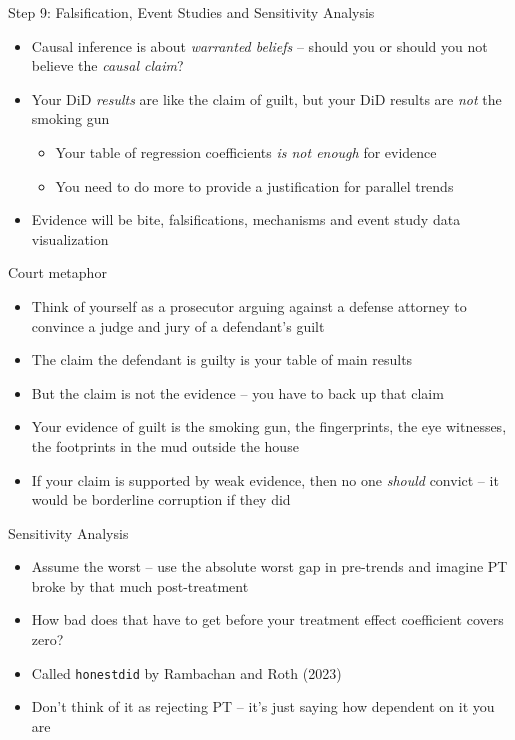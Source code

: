 \documentclass{beamer}
\begin{document}
\begin{frame}{Step 9: Falsification, Event Studies and Sensitivity Analysis}

\begin{itemize}
\item Causal inference is about \emph{warranted beliefs} -- should you or should you not believe the \emph{causal claim}?
\item Your DiD \emph{results} are like the claim of guilt, but your DiD results are \emph{not} the smoking gun
	\begin{itemize}
	\item Your table of regression coefficients \emph{is not enough} for evidence
	\item You need to do more to provide a justification for parallel trends
	\end{itemize}
\item Evidence will be bite, falsifications, mechanisms and event study data visualization 
\end{itemize}

\end{frame}


\begin{frame}{Court metaphor}

	\begin{itemize}
	\item Think of yourself as a prosecutor arguing against a defense attorney to convince a judge and jury of a defendant's guilt
	\item The claim the defendant is guilty is your table of main results
	\item But the claim is not the evidence -- you have to back up that claim 
	\item Your evidence of guilt is the smoking gun, the fingerprints, the eye witnesses, the footprints in the mud outside the house
	\item If your claim is supported by weak evidence, then no one \emph{should} convict -- it would be borderline corruption if they did 
	\end{itemize}

\end{frame}


\begin{frame}{Sensitivity Analysis}

\begin{itemize}
\item Assume the worst -- use the absolute worst gap in pre-trends and imagine PT broke by that much post-treatment
\item How bad does that have to get before your treatment effect coefficient covers zero?
\item Called \texttt{honestdid} by Rambachan and Roth (2023) 
\item Don't think of it as rejecting PT -- it's just saying how dependent on it you are
\end{itemize}

\end{frame}
\end{document}
